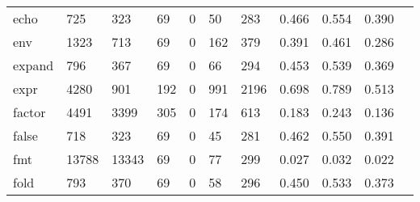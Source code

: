 \begin{longtable}{lp{1.10cm}p{1.10cm}p{1.10cm}p{1.10cm}p{1.10cm}p{1.10cm}p{1.10cm}p{1.10cm}p{1.10cm}p{1.10cm}}
echo      &                    725 &                                323 &                                69 &                                0 &                                50 &                             283 &                          0.466 &                                 0.554 &                               0.390 \\
env       &                   1323 &                                713 &                                69 &                                0 &                               162 &                             379 &                          0.391 &                                 0.461 &                               0.286 \\
expand    &                    796 &                                367 &                                69 &                                0 &                                66 &                             294 &                          0.453 &                                 0.539 &                               0.369 \\
expr      &                   4280 &                                901 &                               192 &                                0 &                               991 &                            2196 &                          0.698 &                                 0.789 &                               0.513 \\
factor    &                   4491 &                               3399 &                               305 &                                0 &                               174 &                             613 &                          0.183 &                                 0.243 &                               0.136 \\
false     &                    718 &                                323 &                                69 &                                0 &                                45 &                             281 &                          0.462 &                                 0.550 &                               0.391 \\
fmt       &                  13788 &                              13343 &                                69 &                                0 &                                77 &                             299 &                          0.027 &                                 0.032 &                               0.022 \\
fold      &                    793 &                                370 &                                69 &                                0 &                                58 &                             296 &                          0.450 &                                 0.533 &                               0.373 \\

\end{longtable}
